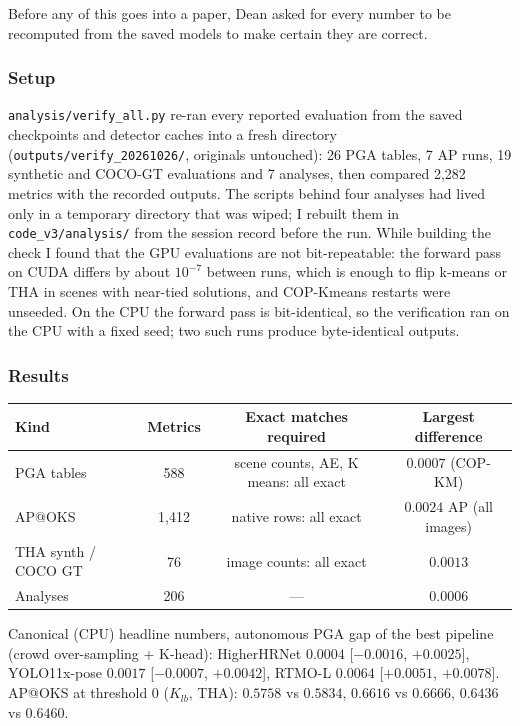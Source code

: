 Before any of this goes into a paper, Dean asked for every number to be recomputed from the saved models to make certain they are correct.

\subsubsection{Setup}

\texttt{analysis/verify\_all.py} re-ran every reported evaluation from the saved checkpoints and detector caches into a fresh directory (\texttt{outputs/verify\_20261026/}, originals untouched): 26 PGA tables, 7 AP runs, 19 synthetic and COCO-GT evaluations and 7 analyses, then compared 2,282 metrics with the recorded outputs. The scripts behind four analyses had lived only in a temporary directory that was wiped; I rebuilt them in \texttt{code\_v3/analysis/} from the session record before the run.
While building the check I found that the GPU evaluations are not bit-repeatable: the forward pass on CUDA differs by about $10^{-7}$ between runs, which is enough to flip k-means or THA in scenes with near-tied solutions, and COP-Kmeans restarts were unseeded. On the CPU the forward pass is bit-identical, so the verification ran on the CPU with a fixed seed; two such runs produce byte-identical outputs.

\subsubsection{Results}

\begin{tabular}{lccc}
\hline
\textbf{Kind} & \textbf{Metrics} & \textbf{Exact matches required} & \textbf{Largest difference} \\
\hline
PGA tables          & 588   & scene counts, AE, K means: all exact & $0.0007$ (COP-KM) \\
AP@OKS              & 1,412 & native rows: all exact               & $0.0024$ AP (all images) \\
THA synth / COCO GT & 76    & image counts: all exact              & $0.0013$ \\
Analyses            & 206   & ---                                  & $0.0006$ \\
\hline
\end{tabular}

\vspace{0.5em}

Canonical (CPU) headline numbers, autonomous PGA gap of the best pipeline (crowd over-sampling + K-head): HigherHRNet $0.0004$ [$-0.0016$, $+0.0025$], YOLO11x-pose $0.0017$ [$-0.0007$, $+0.0042$], RTMO-L $0.0064$ [$+0.0051$, $+0.0078$]. AP@OKS at threshold 0 ($K_{lb}$, THA): $0.5758$ vs $0.5834$, $0.6616$ vs $0.6666$, $0.6436$ vs $0.6460$.

